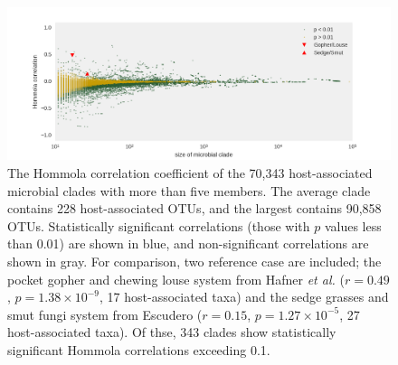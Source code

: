 \begin{figure}
    \includegraphics[width=\textwidth]{FishPoo/figures/Hommola_correlations.png}
    \caption{The Hommola correlation coefficient of the 70,343 host-associated microbial clades with more than five members. The average clade contains 228 host-associated OTUs, and the largest contains 90,858 OTUs. Statistically significant correlations (those with $p$ values less than 0.01) are shown in blue, and non-significant correlations are shown in gray. For comparison, two reference case are included; the pocket gopher and chewing louse system from Hafner {\em et al.} ($r=0.49$, $p=1.38\times 10^{-9}$, 17 host-associated taxa) and the sedge grasses and smut fungi system from Escudero ($r=0.15$, $p=1.27\times 10^{-5}$, 27 host-associated taxa). \cite{hafner1994disparate,escudero2015phylogenetic} Of thse, 343 clades show statistically significant Hommola correlations exceeding 0.1.}
    \label{FP_hommola_corr}
\end{figure}
